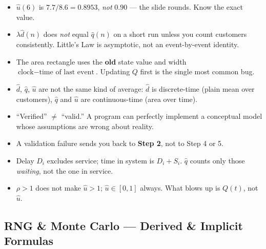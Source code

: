 \begin{trapbox}
\begin{itemize}
\item $\hat u(6)$ is $7.7/8.6 = 0.8953$, \emph{not} $0.90$ --- the slide rounds. Know the exact value.
\item $\lambda\hat d(n)$ does \emph{not} equal $\hat q(n)$ on a short run unless you count customers consistently. Little's Law is asymptotic, not an event-by-event identity.
\item The area rectangle uses the \textbf{old} state value and width $\text{clock}-\text{time of last event}$. Updating $Q$ first is the single most common bug.
\item $\hat d$, $\hat q$, $\hat u$ are not the same kind of average: $\hat d$ is discrete-time (plain mean over customers), $\hat q$ and $\hat u$ are continuous-time (area over time).
\item ``Verified'' $\ne$ ``valid.'' A program can perfectly implement a conceptual model whose assumptions are wrong about reality.
\item A validation failure sends you back to \textbf{Step 2}, not to Step 4 or 5.
\item Delay $D_i$ excludes service; time in system is $D_i+S_i$. $\hat q$ counts only those \emph{waiting}, not the one in service.
\item $\rho > 1$ does not make $\hat u > 1$; $\hat u \in [0,1]$ always. What blows up is $Q(t)$, not $\hat u$.
\end{itemize}
\end{trapbox}

\subsection{RNG \& Monte Carlo --- Derived \& Implicit Formulas}

